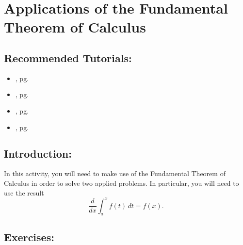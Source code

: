 \section{Applications of the Fundamental Theorem of Calculus}
\label{sec:applications_of_ftc}			

\subsection*{Recommended Tutorials:}
\begin{itemize}[noitemsep]
	\item {}, pg. \pageref{chp:limits}
	\item {}, pg. \pageref{chp:equation_solvers}
	\item {}, pg. \pageref{chp:derivative}
	\item {}, pg. \pageref{chp:definite_and_indefinite_Integrals}
\end{itemize}

\subsection*{Introduction:}

In this activity, you will need to make use of the Fundamental Theorem of Calculus in order to solve two applied problems. In particular, you will need to use the result \[ \frac{d}{dx} \int_a^x f(t) \, dt = f(x). \]

\vspace{-.5cm}
\subsection*{Exercises:}

